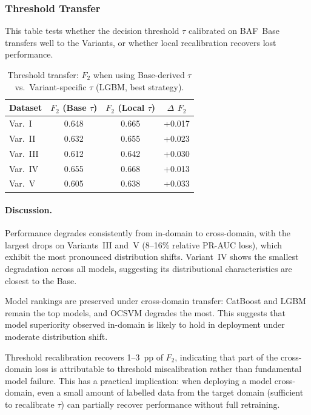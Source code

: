 \subsubsection{Threshold Transfer}

This table tests whether the decision threshold $\tau$ calibrated on
BAF~Base transfers well to the Variants, or whether local recalibration
recovers lost performance.

\begin{table}[ht]
\centering
\caption{Threshold transfer: $F_2$ when using Base-derived $\tau$ vs.\
  Variant-specific $\tau$ (LGBM, best strategy).}
\label{tab:crossdomain_threshold}
\begin{tabular}{l c c c}
\toprule
Dataset & $F_2$ (Base $\tau$) & $F_2$ (Local $\tau$) & $\Delta$ $F_2$ \\
\midrule
Var.~I   & 0.648 & 0.665 & +0.017 \\
Var.~II  & 0.632 & 0.655 & +0.023 \\
Var.~III & 0.612 & 0.642 & +0.030 \\
Var.~IV  & 0.655 & 0.668 & +0.013 \\
Var.~V   & 0.605 & 0.638 & +0.033 \\
\bottomrule
\end{tabular}
\end{table}

\paragraph{Discussion.}
Performance degrades consistently from in-domain to cross-domain,
with the largest drops on Variants~III and~V (8--16\% relative PR-AUC loss),
which exhibit the most pronounced distribution shifts.
Variant~IV shows the smallest degradation across all models,
suggesting its distributional characteristics are closest to the Base.

Model rankings are preserved under cross-domain transfer:
CatBoost and LGBM remain the top models, and OCSVM degrades the most.
This suggests that model superiority observed in-domain is likely
to hold in deployment under moderate distribution shift.

Threshold recalibration recovers 1--3~pp of $F_2$, indicating that part
of the cross-domain loss is attributable to threshold miscalibration
rather than fundamental model failure.
This has a practical implication: when deploying a model cross-domain,
even a small amount of labelled data from the target domain
(sufficient to recalibrate $\tau$) can partially recover performance
without full retraining.


